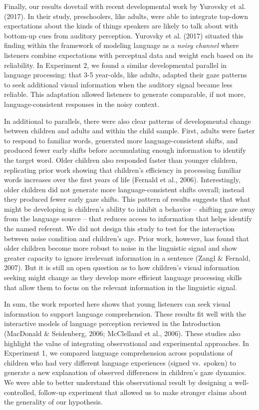 \documentclass[,man,floatsintext]{apa6}
\begin{document}
Finally, our results dovetail with recent developmental work by Yurovsky et al. (2017). In their study, preschoolers, like adults, were able to integrate top-down expectations about the kinds of things speakers are likely to talk about with bottom-up cues from auditory perception. Yurovsky et al. (2017) situated this finding within the framework of modeling language as a \emph{noisy channel} where listeners combine expectations with perceptual data and weight each based on its reliability. In Experiment 2, we found a similar developmental parallel in language processing: that 3-5 year-olds, like adults, adapted their gaze patterns to seek additional visual information when the auditory signal became less reliable. This adaptation allowed listeners to generate comparable, if not more, language-consistent responses in the noisy context.

In additional to parallels, there were also clear patterns of developmental change between children and adults and within the child sample. First, adults were faster to respond to familiar words, generated more language-consistent shifts, and produced fewer early shifts before accumulating enough information to identify the target word. Older children also responded faster than younger children, replicating prior work showing that children's efficiency in processing familiar words increases over the first years of life (Fernald et al., 2006). Interestingly, older children did not generate more language-consistent shifts overall; instead they produced fewer early gaze shifts. This pattern of results suggests that what might be developing is children's ability to inhibit a behavior -- shifting gaze away from the language source -- that reduces access to information that helps identify the named referent. We did not design this study to test for the interaction between noise condition and children's age. Prior work, however, has found that older children become more robust to noise in the linguistic signal and show greater capacity to ignore irrelevant information in a sentence (Zangl \& Fernald, 2007). But it is still an open question as to how children's visual information seeking might change as they develop more efficient language processing skills that allow them to focus on the relevant information in the linguistic signal.

In sum, the work reported here shows that young listeners can seek visual information to support language comprehension. These results fit well with the interactive models of language perception reviewed in the Introduction (MacDonald \& Seidenberg, 2006; McClelland et al., 2006). These studies also highlight the value of integrating observational and experimental approaches. In Experiment 1, we compared language comprehension across populations of children who had very different language experiences (signed vs.~spoken) to generate a new explanation of observed differences in children's gaze dynamics. We were able to better understand this observational result by designing a well-controlled, follow-up experiment that allowed us to make stronger claims about the generality of our hypothesis.
\end{document}
